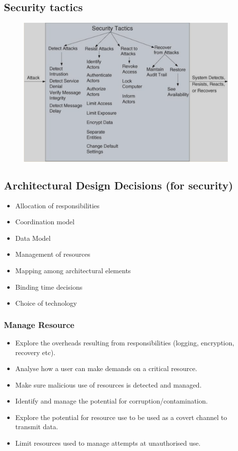 \documentclass[a4paper]{article}
\begin{document}
\subsection{Security tactics}
\begin{figure}[H]
\centering 
\includegraphics[scale=0.3]{images/security-tactics.png}
\end{figure}

\subsection{Architectural Design Decisions (for security)}
\begin{itemize}
\item{Allocation of responsibilities}
\item{Coordination model}
\item{Data Model}
\item{Management of resources}
\item{Mapping among architectural elements}
\item{Binding time decisions}
\item{Choice of technology}
\end{itemize}
\subsubsection{Manage Resource}
\begin{itemize}
\item Explore the overheads resulting from responsibilities (logging, encryption, recovery etc).
\item Analyse how a user can make demands on a critical resource.
\item Make sure malicious use of resources is detected and managed.
\item Identify and manage the potential for corruption/contamination.
\item Explore the potential for resource use to be used as a covert channel to transmit data.
\item Limit resources used to manage attempts at unauthorised use.
\end{itemize}
\end{document}
